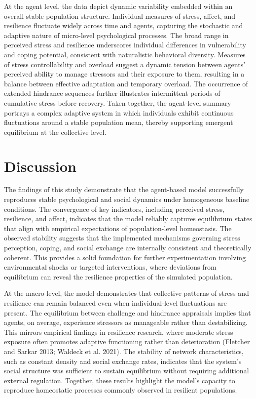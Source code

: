 \documentclass[
  letterpaper,
  DIV=11,
  numbers=noendperiod]{scrartcl}
\begin{document}
At the agent level, the data depict dynamic variability embedded within
an overall stable population structure. Individual measures of stress,
affect, and resilience fluctuate widely across time and agents,
capturing the stochastic and adaptive nature of micro-level
psychological processes. The broad range in perceived stress and
resilience underscores individual differences in vulnerability and
coping potential, consistent with naturalistic behavioral diversity.
Measures of stress controllability and overload suggest a dynamic
tension between agents' perceived ability to manage stressors and their
exposure to them, resulting in a balance between effective adaptation
and temporary overload. The occurrence of extended hindrance sequences
further illustrates intermittent periods of cumulative stress before
recovery. Taken together, the agent-level summary portrays a complex
adaptive system in which individuals exhibit continuous fluctuations
around a stable population mean, thereby supporting emergent equilibrium
at the collective level.

\section{Discussion}\label{discussion}

The findings of this study demonstrate that the agent-based model
successfully reproduces stable psychological and social dynamics under
homogeneous baseline conditions. The convergence of key indicators,
including perceived stress, resilience, and affect, indicates that the
model reliably captures equilibrium states that align with empirical
expectations of population-level homeostasis. The observed stability
suggests that the implemented mechanisms governing stress perception,
coping, and social exchange are internally consistent and theoretically
coherent. This provides a solid foundation for further experimentation
involving environmental shocks or targeted interventions, where
deviations from equilibrium can reveal the resilience properties of the
simulated population.

At the macro level, the model demonstrates that collective patterns of
stress and resilience can remain balanced even when individual-level
fluctuations are present. The equilibrium between challenge and
hindrance appraisals implies that agents, on average, experience
stressors as manageable rather than destabilizing. This mirrors
empirical findings in resilience research, where moderate stress
exposure often promotes adaptive functioning rather than deterioration
(Fletcher and Sarkar 2013; Waldeck et al. 2021). The stability of
network characteristics, such as constant density and social exchange
rates, indicates that the system's social structure was sufficient to
sustain equilibrium without requiring additional external regulation.
Together, these results highlight the model's capacity to reproduce
homeostatic processes commonly observed in resilient populations.
\end{document}
